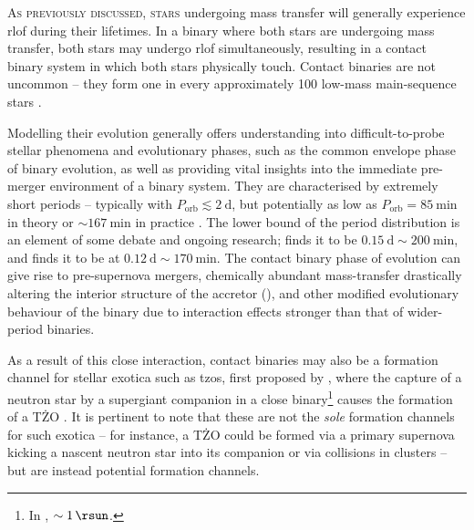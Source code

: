 
\label{chap:close_contact}

\lettrine[lines=3]{A}{s previously discussed, stars} undergoing mass transfer will generally experience \gls{rlof} during their lifetimes. In a binary where both stars are undergoing mass transfer, both stars may undergo \gls{rlof} simultaneously, resulting in a contact binary system in which both stars physically touch. Contact binaries are not uncommon -- they form one in every approximately 100 low-mass main-sequence stars \citep{Rucinski:1998}.

Modelling their evolution generally offers understanding into difficult-to-probe stellar phenomena and evolutionary phases, such as the common envelope phase of binary evolution, as well as providing vital insights into the immediate pre-merger environment of a binary system. They are characterised by extremely short periods -- typically with $P_\text{orb}\lesssim\SI{2}{\day}$, but potentially as low as $P_\text{orb}=\SI{85}{\minute}$ in theory \citep{El-badry:2022} or $\sim\SI{167}{\minute}$ in practice \citep{Koen:2022}. The lower bound of the period distribution is an element of some debate and ongoing research; \citet{Qian:2020} finds it to be $\SI{0.15}{\day}\sim\SI{200}{\minute}$, and \citet{Zhang:2023} finds it to be at $\SI{0.12}{\day}\sim\SI{170}{\minute}$. The contact binary phase of evolution can give rise to pre-supernova mergers, chemically abundant mass-transfer drastically altering the interior structure of the accretor (), and other modified evolutionary behaviour of the binary due to interaction effects stronger than that of wider-period binaries.

As a result of this close interaction, contact binaries may also be a formation channel for stellar exotica such as \glspl{tzo}, first proposed by \citet{Thorne:1977}, where the capture of a neutron star by a supergiant companion in a close binary\footnote{In \citet{Taam:1978}, $\sim\SI{1}{\rsun}$.} causes the formation of a T\.ZO \citep{Taam:1978}. It is pertinent to note that these are not the \textit{sole} formation channels for such exotica -- for instance, a T\.ZO could be formed via a primary supernova kicking a nascent neutron star into its companion \citep{Leonard:1994, Podsiadlowski:1995} or via collisions in clusters \citep{Podsiadlowski:1995} -- but are instead potential formation channels.

